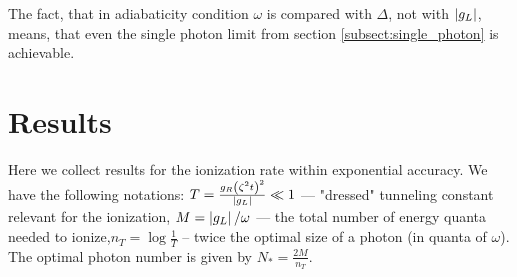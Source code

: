  The fact, that in adiabaticity condition  $\omega  $ is compared with $ \Delta $, not with $ \left|g_L\right| $, means, that even the single photon limit from section \ref{subsect:single_photon} is achievable. 
\section{Results}

Here we collect results for the ionization rate  within exponential accuracy.  We have the following notations: $ T=\frac{g_R\left(\zeta^2t\right)^2}{\left|g_L\right|}\ll1 $ --- "dressed" tunneling constant relevant for the ionization, $M=\left|g_{L}\right|/\omega$ ---
 the total number of energy quanta needed to ionize,$n_{T}=\log\frac{1}{T}$
-- twice the optimal size of a photon (in quanta of $\omega$). The optimal photon number is given by $ N_*=\frac{2M}{n_T} $.


